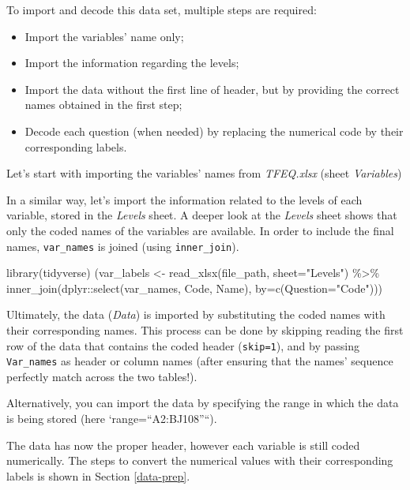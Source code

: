 \documentclass[
]{book}
\newenvironment{Shaded}{\begin{snugshade}}{\end{snugshade}}
\newcommand{\AttributeTok}[1]{\textcolor[rgb]{0.77,0.63,0.00}{#1}}
\newcommand{\FunctionTok}[1]{\textcolor[rgb]{0.00,0.00,0.00}{#1}}
\newcommand{\NormalTok}[1]{#1}
\newcommand{\OtherTok}[1]{\textcolor[rgb]{0.56,0.35,0.01}{#1}}
\newcommand{\SpecialCharTok}[1]{\textcolor[rgb]{0.00,0.00,0.00}{#1}}
\newcommand{\StringTok}[1]{\textcolor[rgb]{0.31,0.60,0.02}{#1}}
\providecommand{\tightlist}{%
  \setlength{\itemsep}{0pt}\setlength{\parskip}{0pt}}
\begin{document}
To import and decode this data set, multiple steps are required:

\begin{itemize}
\tightlist
\item
  Import the variables' name only;
\item
  Import the information regarding the levels;
\item
  Import the data without the first line of header, but by providing the correct names obtained in the first step;
\item
  Decode each question (when needed) by replacing the numerical code by their corresponding labels.
\end{itemize}

Let's start with importing the variables' names from \emph{TFEQ.xlsx} (sheet \emph{Variables})

In a similar way, let's import the information related to the levels of each variable, stored in the \emph{Levels} sheet.
A deeper look at the \emph{Levels} sheet shows that only the coded names of the variables are available. In order to include the final names, \texttt{var\_names} is joined (using \texttt{inner\_join}).

\begin{Shaded}
\begin{Highlighting}[]
\FunctionTok{library}\NormalTok{(tidyverse)}
\NormalTok{(var\_labels }\OtherTok{\textless{}{-}} \FunctionTok{read\_xlsx}\NormalTok{(file\_path, }\AttributeTok{sheet=}\StringTok{"Levels"}\NormalTok{) }\SpecialCharTok{\%\textgreater{}\%} 
  \FunctionTok{inner\_join}\NormalTok{(dplyr}\SpecialCharTok{::}\FunctionTok{select}\NormalTok{(var\_names, Code, Name), }\AttributeTok{by=}\FunctionTok{c}\NormalTok{(}\AttributeTok{Question=}\StringTok{"Code"}\NormalTok{)))}
\end{Highlighting}
\end{Shaded}

Ultimately, the data (\emph{Data}) is imported by substituting the coded names with their corresponding names. This process can be done by skipping reading the first row of the data that contains the coded header (\texttt{skip=1}), and by passing \texttt{Var\_names} as header or column names (after ensuring that the names' sequence perfectly match across the two tables!).

Alternatively, you can import the data by specifying the range in which the data is being stored (here `range=``A2:BJ108''``).

The data has now the proper header, however each variable is still coded numerically. The steps to convert the numerical values with their corresponding labels is shown in Section \ref{data-prep}.
\end{document}
